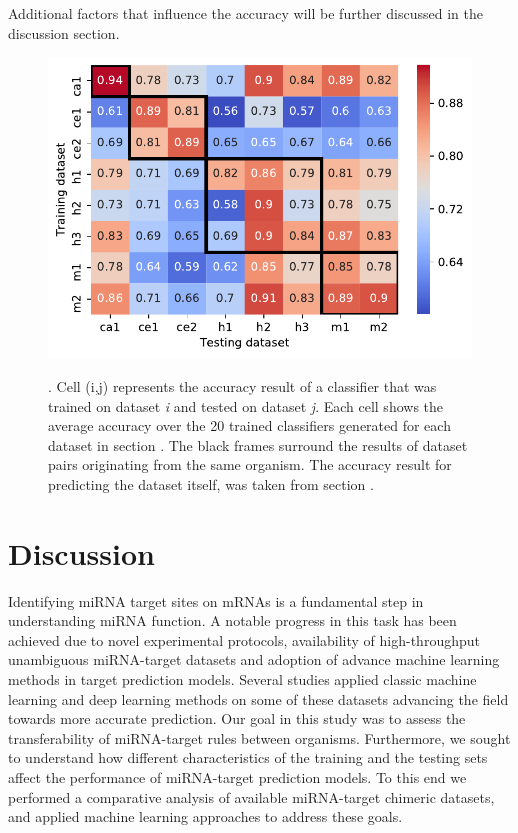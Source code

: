 \documentclass{bmcart}
\begin{document}
Additional  factors that influence the accuracy will be further discussed in the discussion section.


\begin{figure}[h!]
  \caption{. Cell (i,j) represents the accuracy result of a classifier that was trained on dataset \textit{i} and tested on dataset \textit{j}. Each cell shows the average accuracy over the 20 trained classifiers generated for each dataset in section . The black frames surround the results of dataset pairs originating from the same organism. The accuracy result for predicting the dataset itself, was taken from section . }
      \includegraphics[width = 1\textwidth]{Results/diff_summary.pdf}
    \label{fig:crossdataset}
      \end{figure}

\clearpage
\section*{Discussion}
Identifying miRNA target sites on mRNAs is a fundamental step in understanding miRNA function. A notable progress in this task has been achieved due to novel experimental protocols, availability of high-throughput unambiguous miRNA-target datasets and adoption of advance machine learning methods in target prediction models. Several studies applied classic machine learning \cite{lu2016learning, ding2016tarpmir, wang2016improving, liu2019prediction} and deep learning \cite{wen2018deepmirtar, paker2019mirlstm, pla2018miraw} methods on some of these datasets advancing the field towards more accurate prediction. Our goal in this study was to assess the transferability of miRNA-target rules between organisms. Furthermore, we sought to understand how different characteristics of the training and the testing sets affect the performance of miRNA-target prediction models. To this end we performed a comparative analysis of available miRNA-target chimeric datasets, and applied machine learning approaches to address these goals.
\end{document}
